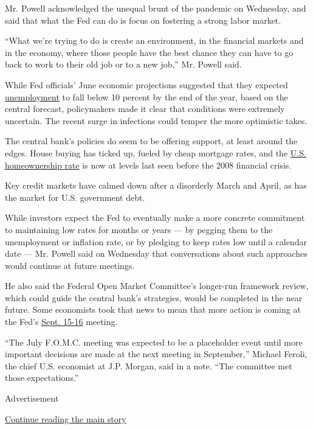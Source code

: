 Mr. Powell acknowledged the unequal brunt of the pandemic on Wednesday,
and said that what the Fed can do is focus on fostering a strong labor
market.

``What we're trying to do is create an environment, in the financial
markets and in the economy, where those people have the best chance they
can have to go back to work to their old job or to a new job,'' Mr.
Powell said.

While Fed officials' June economic projections suggested that they
expected
\href{https://www.federalreserve.gov/monetarypolicy/files/fomcprojtabl20200610.pdf}{unemployment}
to fall below 10 percent by the end of the year, based on the central
forecast, policymakers made it clear that conditions were extremely
uncertain. The recent surge in infections could temper the more
optimistic takes.

The central bank's policies do seem to be offering support, at least
around the edges. House buying has ticked up, fueled by cheap mortgage
rates, and the
\href{https://www.bloomberg.com/news/articles/2020-07-28/homeownership-rate-in-the-u-s-soars-to-highest-level-since-2008?sref=oZtxD6sa}{U.S.
homeownership rate} is now at levels last seen before the 2008 financial
crisis.

Key credit markets have calmed down after a disorderly March and April,
as has the market for U.S. government debt.

While investors expect the Fed to eventually make a more concrete
commitment to maintaining low rates for months or years --- by pegging
them to the unemployment or inflation rate, or by pledging to keep rates
low until a calendar date --- Mr. Powell said on Wednesday that
conversations about such approaches would continue at future meetings.

He also said the Federal Open Market Committee's longer-run framework
review, which could guide the central bank's strategies, would be
completed in the near future. Some economists took that news to mean
that more action is coming at the Fed's
\href{https://www.federalreserve.gov/monetarypolicy/fomccalendars.htm}{Sept.
15-16} meeting.

``The July F.O.M.C. meeting was expected to be a placeholder event until
more important decisions are made at the next meeting in September,''
Michael Feroli, the chief U.S. economist at J.P. Morgan, said in a note.
``The committee met those expectations.''

Advertisement

\protect\hyperlink{after-bottom}{Continue reading the main story}

